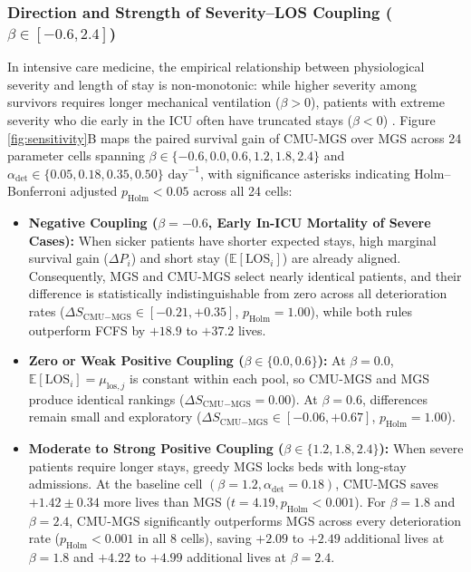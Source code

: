 \documentclass[final,5p,times,twocolumn]{elsarticle}
\begin{document}
\subsubsection{Direction and Strength of Severity--LOS Coupling ($\beta \in [-0.6, 2.4]$)}
In intensive care medicine, the empirical relationship between physiological severity and length of stay is non-monotonic: while higher severity among survivors requires longer mechanical ventilation ($\beta > 0$), patients with extreme severity who die early in the ICU often have truncated stays ($\beta < 0$) \cite{soares2024orchestra, zampieri2019icu}. Figure \ref{fig:sensitivity}B maps the paired survival gain of CMU-MGS over MGS across 24 parameter cells spanning $\beta \in \{-0.6, 0.0, 0.6, 1.2, 1.8, 2.4\}$ and $\alpha_{\text{det}} \in \{0.05, 0.18, 0.35, 0.50\}\text{ day}^{-1}$, with significance asterisks indicating Holm--Bonferroni adjusted $p_{\text{Holm}} < 0.05$ across all 24 cells:
\begin{itemize}
    \item \textbf{Negative Coupling ($\beta = -0.6$, Early In-ICU Mortality of Severe Cases):} When sicker patients have shorter expected stays, high marginal survival gain ($\Delta P_i$) and short stay ($\mathbb{E}[\text{LOS}_i]$) are already aligned. Consequently, MGS and CMU-MGS select nearly identical patients, and their difference is statistically indistinguishable from zero across all deterioration rates ($\Delta S_{\text{CMU}-\text{MGS}} \in [-0.21, +0.35]$, $p_{\text{Holm}} = 1.00$), while both rules outperform FCFS by $+18.9$ to $+37.2$ lives.
    \item \textbf{Zero or Weak Positive Coupling ($\beta \in \{0.0, 0.6\}$):} At $\beta = 0.0$, $\mathbb{E}[\text{LOS}_i] = \mu_{\text{los}, j}$ is constant within each pool, so CMU-MGS and MGS produce identical rankings ($\Delta S_{\text{CMU}-\text{MGS}} = 0.00$). At $\beta = 0.6$, differences remain small and exploratory ($\Delta S_{\text{CMU}-\text{MGS}} \in [-0.06, +0.67]$, $p_{\text{Holm}} = 1.00$).
    \item \textbf{Moderate to Strong Positive Coupling ($\beta \in \{1.2, 1.8, 2.4\}$):} When severe patients require longer stays, greedy MGS locks beds with long-stay admissions. At the baseline cell $(\beta=1.2, \alpha_{\text{det}}=0.18)$, CMU-MGS saves $+1.42 \pm 0.34$ more lives than MGS ($t = 4.19, p_{\text{Holm}} < 0.001$). For $\beta = 1.8$ and $\beta = 2.4$, CMU-MGS significantly outperforms MGS across every deterioration rate ($p_{\text{Holm}} < 0.001$ in all 8 cells), saving $+2.09$ to $+2.49$ additional lives at $\beta = 1.8$ and $+4.22$ to $+4.99$ additional lives at $\beta = 2.4$.
\end{itemize}
\end{document}
